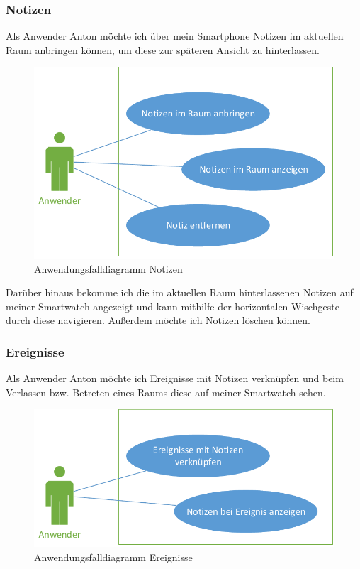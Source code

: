 \subsubsection{Notizen}
Als Anwender Anton möchte ich über mein Smartphone Notizen im aktuellen Raum anbringen können, um diese zur späteren Ansicht zu hinterlassen.

\begin{figure}[H]
\centering
\includegraphics[width=0.7\linewidth]{Bilder/UseCase-Notizen}
\caption{Anwendungsfalldiagramm Notizen}
\label{fig:UseCase-Notizen}
\end{figure}

Darüber hinaus bekomme ich die im aktuellen Raum hinterlassenen Notizen auf meiner Smartwatch angezeigt und kann mithilfe der horizontalen Wischgeste durch diese navigieren. Außerdem möchte ich Notizen löschen können.

\subsubsection{Ereignisse}
Als Anwender Anton möchte ich Ereignisse mit Notizen verknüpfen und beim Verlassen bzw. Betreten eines Raums diese auf meiner Smartwatch sehen.

\begin{figure}[H]
\centering
\includegraphics[width=0.7\linewidth]{Bilder/UseCase-Ereignisse}
\caption{Anwendungsfalldiagramm Ereignisse}
\label{fig:UseCase-Ereignisse}
\end{figure}

